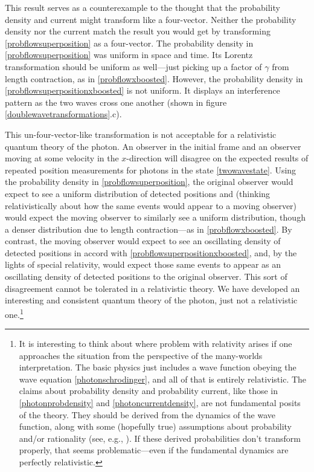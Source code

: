 \documentclass[12pt,secnumarabic,amsmath,amssymb,balancelastpage,nofootinbib]{article}
\begin{document}
This result serves as a counterexample to the thought that the probability density and current might transform like a four-vector.  Neither the probability density nor the current match the result you would get by transforming \eqref{probflowsuperposition} as a four-vector.  The probability density in \eqref{probflowsuperposition} was uniform in space and time.  Its Lorentz transformation should be uniform as well---just picking up a factor of $\gamma$ from length contraction, as in \eqref{probflowxboosted}.  However, the probability density in \eqref{probflowsuperpositionxboosted} is not uniform.  It displays an interference pattern as the two waves cross one another (shown in figure \ref{doublewavetransformations}.c).


This un-four-vector-like transformation is not acceptable for a relativistic quantum theory of the photon.  An observer in the initial frame and an observer moving at some velocity in the $x$-direction will disagree on the expected results of repeated position measurements for photons in the state \eqref{twowavestate}.  Using the probability density in \eqref{probflowsuperposition}, the original observer would expect to see a uniform distribution of detected positions and (thinking relativistically about how the same events would appear to a moving observer) would expect the moving observer to similarly see a uniform distribution, though a denser distribution due to length contraction---as in \eqref{probflowxboosted}.  By contrast, the moving observer would expect to see an oscillating density of detected positions in accord with \eqref{probflowsuperpositionxboosted}, and, by the lights of special relativity, would expect those same events to appear as an oscillating density of detected positions to the original observer.  This sort of disagreement cannot be tolerated in a relativistic theory.  We have developed an interesting and consistent quantum theory of the photon, just not a relativistic one.\footnote{It is interesting to think about where problem with relativity arises if one approaches the situation from the perspective of the many-worlds interpretation.  The basic physics just includes a wave function obeying the wave equation \eqref{photonschrodinger}, and all of that is entirely relativistic.  The claims about probability density and probability current, like those in \eqref{photonprobdensity} and \eqref{photoncurrentdensity}, are not fundamental posits of the theory.  They should be derived from the dynamics of the wave function, along with some (hopefully true) assumptions about probability and/or rationality (see, e.g., \citealp{wallace2012, carrollsebens2014, barrett2017, sebenscarroll2018}).  If these derived probabilities don't transform properly, that seems problematic---even if the fundamental dynamics are perfectly relativistic.}
\end{document}
